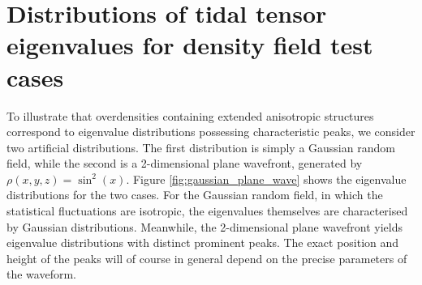 \documentclass[a4paper,11pt]{article}
\begin{document}
\section{Distributions of tidal tensor eigenvalues for density field test cases}\label{app:prob_distro_eg}

To illustrate that overdensities containing extended anisotropic structures correspond to eigenvalue distributions possessing characteristic peaks, we consider two artificial distributions. The first distribution is simply a Gaussian random field, while the second is a 2-dimensional plane wavefront, generated by $\rho(x,y,z)=\sin^2{(x)}$. Figure \ref{fig:gaussian_plane_wave} shows the eigenvalue distributions for the two cases. For the Gaussian random field, in which the statistical fluctuations are isotropic, the eigenvalues themselves are characterised by Gaussian distributions. Meanwhile, the 2-dimensional plane wavefront yields eigenvalue distributions with distinct prominent peaks. The exact position and height of the peaks will of course in general depend on the precise parameters of the waveform.
\end{document}
